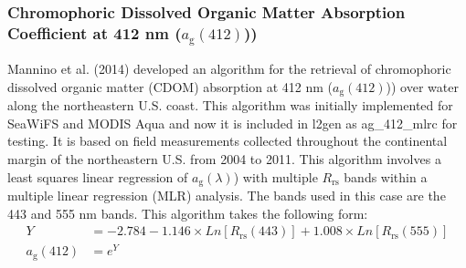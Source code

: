 \documentclass[remotesensing,article,submit,moreauthors,pdftex,10pt,a4paper]{Definitions/mdpi}
\begin{document}

    


\subsubsection{Chromophoric Dissolved Organic Matter Absorption Coefficient at 412 nm ($a_\text{g}(412)$))}

Mannino et al. (2014) \cite{Mannino2014} developed an algorithm for the retrieval of chromophoric dissolved organic matter (CDOM) absorption at 412 nm ($a_\text{g}(412)$)) over water along the northeastern U.S. coast. This algorithm was initially implemented for SeaWiFS and MODIS Aqua and now it is included in l2gen as ag\_412\_mlrc for testing. It is based on field measurements collected throughout the continental margin of the northeastern U.S. from 2004 to 2011. This algorithm involves a least squares linear regression of $a_\text{g}(\lambda)$) with multiple $R_\text{rs}$ bands within a multiple linear regression (MLR) analysis. The bands used in this case are the 443 and 555 nm bands. This algorithm takes the following form: 
\begin{equation}
\begin{split}
  Y &= -2.784 -1.146\times Ln[R_\text{rs}(443)] + 1.008\times Ln[R_\text{rs}(555)] \\
  a_\text{g}(412) &= e^Y
\end{split}
\end{equation}

\end{document}
